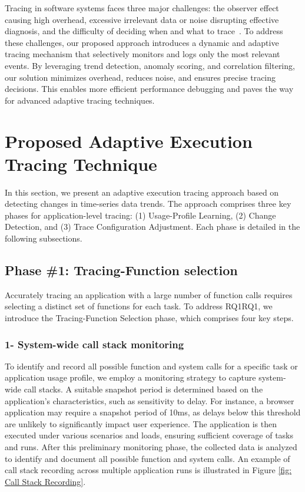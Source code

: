 \documentclass[pdflatex,sn-nature]{sn-jnl}%
\theoremstyle{thmstyleone}%
\theoremstyle{thmstyletwo}%
\theoremstyle{thmstylethree}%
\begin{document}
Tracing in software systems faces three major challenges: the observer effect causing high overhead, excessive irrelevant data or noise disrupting effective diagnosis, and the difficulty of deciding when and what to trace~\cite{parker-2020}. To address these challenges, our proposed approach introduces a dynamic and adaptive tracing mechanism that selectively monitors and logs only the most relevant events. By leveraging trend detection, anomaly scoring, and correlation filtering, our solution minimizes overhead, reduces noise, and ensures precise tracing decisions. This enables more efficient performance debugging and paves the way for advanced adaptive tracing techniques.



\section{Proposed Adaptive Execution Tracing Technique} \label{methodology}


In this section, we present an adaptive execution tracing approach based on detecting changes in time-series data trends. The approach comprises three key phases for application-level tracing: (1) Usage-Profile Learning, (2) Change Detection, and (3) Trace Configuration Adjustment. Each phase is detailed in the following subsections.


\subsection{Phase \#1: Tracing-Function selection}\label{Pre-Testing and Methods Selection}

Accurately tracing an application with a large number of function calls requires selecting a distinct set of functions for each task. To address RQ1RQ1, we introduce the Tracing-Function Selection phase, which comprises four key steps.

\subsubsection{1- System-wide call stack monitoring}
To identify and record all possible function and system calls for a specific task or application usage profile, we employ a monitoring strategy to capture system-wide call stacks. A suitable snapshot period is determined based on the application's characteristics, such as sensitivity to delay. For instance, a browser application may require a snapshot period of 10ms, as delays below this threshold are unlikely to significantly impact user experience. The application is then executed under various scenarios and loads, ensuring sufficient coverage of tasks and runs. After this preliminary monitoring phase, the collected data is analyzed to identify and document all possible function and system calls. An example of call stack recording across multiple application runs is illustrated in Figure \ref{fig: Call Stack Recording}.
\end{document}

